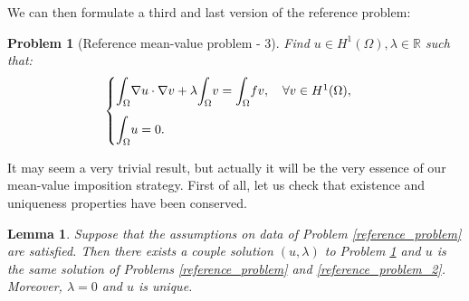 \documentclass[a4paper,11pt]{article}
\newtheorem{problem}{Problem}
\newtheorem{lemma}{Lemma}
\begin{document}
\noindent We can then formulate a third and last version of the reference problem:
\begin{problem}[Reference mean-value problem - 3]\label{reference_problem_3} Find $ u \in H^1(\Omega), \lambda \in \mathbb{R}$ such that:
	\begin{equation*}
	\begin{cases}
	\mathlarger{\int}_{\Omega}\nabla u \cdot \nabla v + \lambda \mathlarger{\int}_\Omega v = \mathlarger{\int}_{\Omega} fv, \quad \forall v \in H^1(\Omega), \\[3ex]
	\mathlarger{\int}_{\Omega}u= 0.
	\end{cases}
	\end{equation*}
\end{problem}

\noindent It may seem a very trivial result, but actually it will be the very essence of our mean-value imposition strategy. First of all, let us check that existence and uniqueness properties have been conserved. \\
\begin{lemma} \label{lemma_lagrange}
	Suppose that the assumptions on data of Problem \ref{reference_problem} are satisfied. Then there exists a couple solution $(u,\lambda)$ to Problem \ref{reference_problem_3} and $u$ is the same solution of Problems \ref{reference_problem} and \ref{reference_problem_2}. Moreover, $\lambda=0$ and $u$ is unique. 
\end{lemma}
\end{document}
